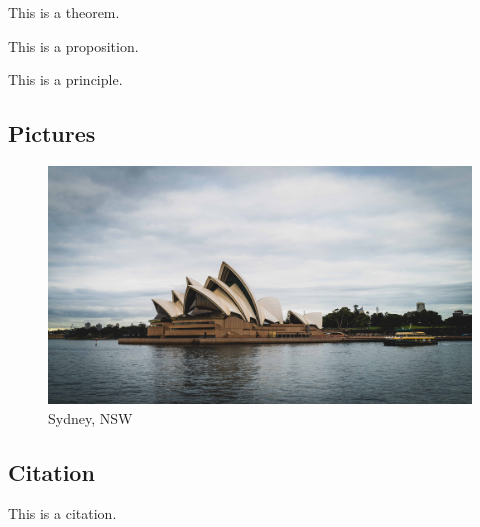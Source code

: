 \documentclass{article}
\begin{document}
\begin{theorem}
    This is a theorem.
\end{theorem}

\begin{proposition}
    This is a proposition.
\end{proposition}

\begin{principle}
    This is a principle.
\end{principle}


\subsection{Pictures}

\begin{figure}[htbp]
    \center
    \includegraphics[scale=0.06]{img/photo.jpg}
    \caption{Sydney, NSW}
\end{figure}

\subsection{Citation}

This is a citation\cite{Eg}.

\newpage





\end{document}
